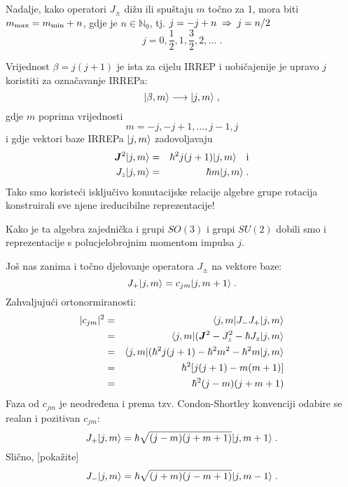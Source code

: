 Nadalje, kako operatori $J_\pm$ dižu ili spuštaju $m$ točno za 1, mora
biti $m_{\textrm{\scriptsize max}} = m_{\textrm{\scriptsize min}} +n $,
gdje je $n\in \mathbb{N}_{0}$, tj. $j = -j +n  \;\Rightarrow\; j=n/2$
\begin{displaymath}
  j= 0, \frac{1}{2}, 1, \frac{3}{2}, 2, \ldots \;.
\end{displaymath}

  Vrijednost $\beta = j(j+1)$ je ista za cijelu IRREP i uobičajenije
je upravo $j$ koristiti za označavanje IRREPa:
\begin{displaymath}
  | \beta, m \rangle \longrightarrow | j, m \rangle \;,
\end{displaymath}
gdje $m$ poprima vrijednosti
\begin{displaymath}
   m= -j, -j+1, \ldots, j-1, j
\end{displaymath}
i gdje vektori baze IRREPa $| j, m \rangle$ zadovoljavaju
\begin{eqnarray*}
 \jsq \ket{j, m}& = & \hbar^2 j(j+1)\ket{j, m} \quad \mbox{i} \\
 J_z \ket{j, m} & =  &\hbar m \ket{j, m} \;.
\end{eqnarray*}
Tako smo koristeći isključivo komutacijske relacije algebre grupe rotacija
konstruirali sve njene ireducibilne reprezentacije!

Kako je ta algebra zajednička i grupi $SO(3)$ i grupi $SU(2)$ dobili
smo i reprezentacije s polucjelobrojnim momentom impulsa $j$.

Još nas zanima i točno djelovanje operatora $J_\pm$ na vektore baze:
\begin{displaymath}
     J_+ | j, m \rangle = c_{jm} | j, m+1 \rangle \;.
\end{displaymath}
Zahvaljujući ortonormiranosti:
\begin{eqnarray*}
 |c_{jm}|^2 & = & \bra{j, m} J_- J_+ \ket{j, m} \\
            & = & \bra{j, m}(\jsq - J_{z}^2 - \hbar J_z \ket{j, m} \\
& = & \bra{j, m}(\hbar^2 j(j+1) - \hbar^2 m^2 - \hbar^2 m \ket{j, m}  \\
            & = & \hbar^2[j(j+1)-m(m+1)] \\
            & = & \hbar^2 (j-m)(j+m+1)
\end{eqnarray*}
Faza od $c_{jm}$ je neodređena i prema tzv. Condon-Shortley konvenciji
odabire se realan i pozitivan $c_{jm}$:
\begin{displaymath}
  J_+ | j, m \rangle = \hbar \sqrt{(j-m)(j+m+1)} | j, m+1 \rangle \;.
\label{jplus}
\end{displaymath}
Slično, [pokažite]
\begin{displaymath}
  J_- | j, m \rangle = \hbar \sqrt{(j+m)(j-m+1)} | j, m-1 \rangle \;.
\label{jminus}
\end{displaymath}


